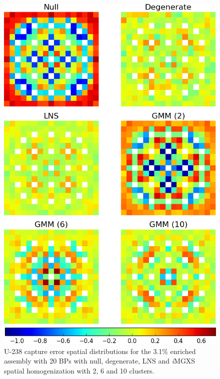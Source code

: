 \begin{figure}[h!]
\centering
\includegraphics[width=0.9\linewidth]{figures/results/spatial/assm-31-20BPs/capt-err}
\vspace{2mm}
\caption[U-238 capture errors for the 3.1\% enriched assembly with 20 BPs]{U-238 capture error spatial distributions for the 3.1\% enriched assembly with 20 \acp{BP} with null, degenerate, \ac{LNS} and \textit{i}\ac{MGXS} spatial homogenization with 2, 6 and 10 clusters.}
\label{fig:chap11-assm-3.1-20BPs-capt-err}
\end{figure}

\clearpage

